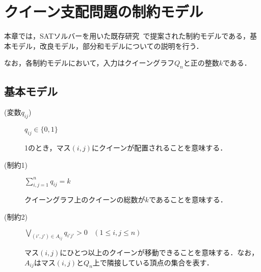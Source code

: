 \chapter{クイーン支配問題の制約モデル}\label{chap:constraint}
本章では，SATソルバーを用いた既存研究~\cite{yamamoto21}で提案された制約モデルである，基本モデル，改良モデル，部分和モデルについての説明を行う．\par
なお，各制約モデルにおいて，入力はクイーングラフ$Q_{n}$と正の整数$k$である．
\section{基本モデル}
\begin{description}
 \item[(変数$q_{ij}$)] $q_{ij} \in \{0,1\}$ \par
1のとき，マス$(i,j)$にクイーンが配置されることを意味する．
 \item[(制約1)] $\sum\limits_{i,j=1}^{n} q_{ij} = k$ \par
クイーングラフ上のクイーンの総数が$k$であることを意味する．
 \item[(制約2)] $\bigvee\limits_{(i',j')\in A_{ij}} q_{i'j'}>0 \;\;\;(1 \leq i,j \leq n)$ \par
マス$(i,j)$にひとつ以上のクイーンが移動できることを意味する．なお，$A_{ij}$はマス$(i,j)$と$Q_n$上で隣接している頂点の集合を表す．
\end{description}
\newpage
